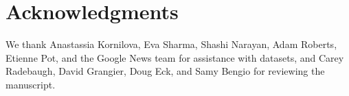 \section*{Acknowledgments}
We thank Anastassia Kornilova, Eva Sharma, Shashi Narayan,
 Adam Roberts, Etienne Pot, and the Google News team for assistance with datasets, and
 Carey Radebaugh, David Grangier, Doug Eck, and Samy Bengio for reviewing the manuscript.